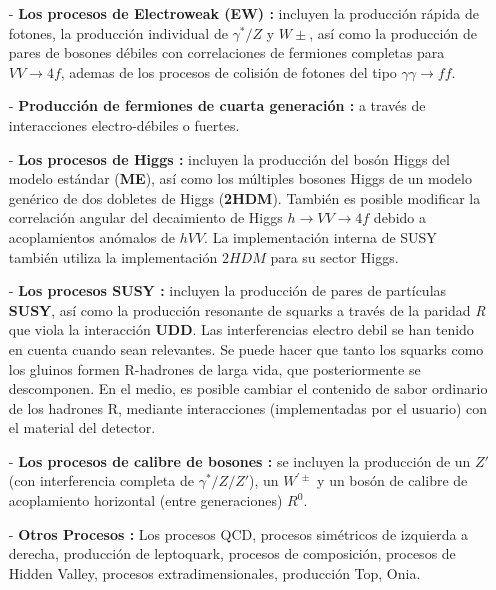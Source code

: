 \begin{itemize}
\item[-] \textbf{Los procesos de Electroweak (EW) :} incluyen la producción rápida de fotones, la producción individual de $\gamma^*/Z$ y $W\pm$, así como la producción de pares de bosones débiles con correlaciones de fermiones completas para $V V \rightarrow 4f$, ademas de los procesos de colisión de fotones del tipo $\gamma \gamma \rightarrow ff$.
\item[-] \textbf{Producción de fermiones de cuarta generación :} a través de interacciones electro-débiles o fuertes.
\item[-] \textbf{Los procesos de Higgs :} incluyen la producción del bosón Higgs del modelo estándar (\textbf{ME}), así como los múltiples bosones Higgs de un modelo genérico de dos dobletes de Higgs (\textbf{2HDM}). También es posible modificar la correlación angular del decaimiento de Higgs $h \rightarrow V V \rightarrow 4f$ debido a acoplamientos anómalos de $hV V$. La implementación interna de SUSY también utiliza la implementación $2HDM$ para su sector Higgs.
\item[-] \textbf{Los procesos SUSY :} incluyen la producción de pares de partículas \textbf{SUSY}, así como la producción resonante de squarks a través de la paridad \textit{R} que viola la interacción \textbf{UDD}. Las interferencias electro debil se han tenido en cuenta cuando sean relevantes. Se puede hacer que tanto los squarks como los gluinos formen R-hadrones de larga vida, que posteriormente se descomponen. En el medio, es posible cambiar el contenido de sabor ordinario de los hadrones R, mediante interacciones (implementadas por el usuario) con el material del detector.
\item[-] \textbf{Los procesos de calibre de bosones :} se incluyen la producción de un $Z'$ (con interferencia completa de $\gamma^*/Z/Z'$), un $W^{'\pm}$ y un bosón de calibre de acoplamiento horizontal (entre generaciones) $R^0$.
\item[-] \textbf{Otros Procesos :} Los procesos QCD, procesos simétricos de izquierda a derecha, producción de leptoquark, procesos de composición, procesos de Hidden Valley, procesos extradimensionales, producción Top, Onia.
\end{itemize}





























